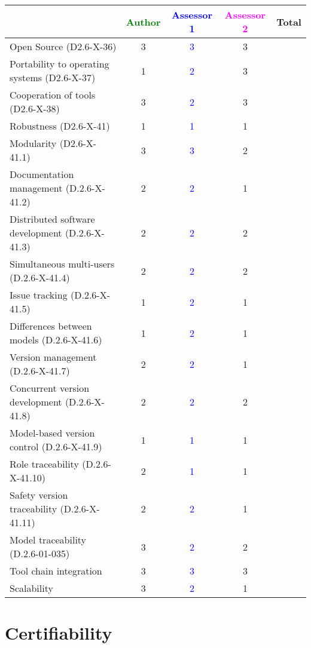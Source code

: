 \begin{tabular}{|l | c | c | c | c|}
\hline
& \textcolor{green}{Author} & \textcolor{blue}{Assessor 1} & \textcolor{magenta}{Assessor 2} & Total \\
\hline
Open Source (D2.6-X-36) & 3 & \textcolor{blue}{3} & 3 & \\
\hline
Portability to operating systems (D2.6-X-37) & 1 & \textcolor{blue}{2} &  3 & \\
\hline
Cooperation of tools (D2.6-X-38) & 3 & \textcolor{blue}{2} & 3 & \\
\hline
Robustness (D2.6-X-41) & 1 & \textcolor{blue}{1} & 1 & \\
\hline
Modularity (D2.6-X-41.1) & 3 & \textcolor{blue}{3} & 2 & \\
\hline
Documentation management (D.2.6-X-41.2) & 2 & \textcolor{blue}{2} & 1  & \\
\hline
Distributed software development (D.2.6-X-41.3) & 2 & \textcolor{blue}{2} & 2 & \\
\hline
Simultaneous multi-users (D.2.6-X-41.4) & 2 & \textcolor{blue}{2} & 2 & \\
\hline
Issue tracking (D.2.6-X-41.5) & 1 & \textcolor{blue}{2} & 1 & \\
\hline
Differences between models (D.2.6-X-41.6) & 1 & \textcolor{blue}{2} & 1 & \\
\hline
Version management (D.2.6-X-41.7) & 2 & \textcolor{blue}{2} & 1 & \\
\hline
Concurrent version development (D.2.6-X-41.8) & 2 & \textcolor{blue}{2} & 2 & \\
\hline
Model-based version control (D.2.6-X-41.9) & 1 & \textcolor{blue}{1} & 1 & \\
\hline
Role traceability (D.2.6-X-41.10) & 2 & \textcolor{blue}{1} & 1 & \\
\hline
Safety version traceability (D.2.6-X-41.11) & 2 & \textcolor{blue}{2} & 1 & \\
\hline
Model traceability (D.2.6-01-035) & 3 & \textcolor{blue}{2} & 2 & \\
\hline
Tool chain integration & 3 & \textcolor{blue}{3} & 3 & \\
\hline
Scalability & 3 & \textcolor{blue}{2} & 1 & \\
\hline
\end{tabular}

\section{Certifiability}

